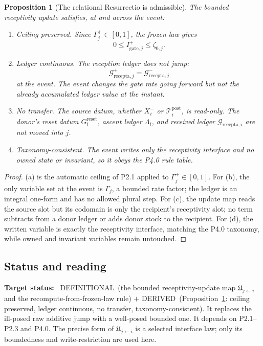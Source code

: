 \documentclass[11pt,a4paper]{article}
\newcommand{\stDerived}{\textcolor{cDer}{\textsf{\small DERIVED}}}
\newcommand{\stDef}{\textcolor{cDef}{\textsf{\small DEFINITIONAL}}}
\theoremstyle{definition}
\theoremstyle{plain}
\newtheorem{proposition}[definition]{Proposition}
\theoremstyle{remark}
\begin{document}
\begin{proposition}[The relational Resurrectio is admissible]\label{prop:relres}
The bounded receptivity update satisfies, at and across the event:
\begin{enumerate}[label=\textup{(\alph*)},leftmargin=1.2cm]
\item \emph{Ceiling preserved.} Since \(\Gamma_j^{+}\in[0,1]\), the frozen law gives
\[
0\le I_{\mathrm{gate},j}^{+}\le\zeta_{0,j}.
\]
\item \emph{Ledger continuous.} The reception ledger does not jump:
\[
\mathcal G_{\mathrm{recepta},j}^{+}
=
\mathcal G_{\mathrm{recepta},j}^{-}
\]
at the event. The event changes the gate rate going forward but not the already
accumulated ledger value at the instant.
\item \emph{No transfer.} The source datum, whether \(X_i^-\) or
\(\mathcal T_i^{\mathrm{post}}\), is read-only. The donor's reset datum
\(G_i^{\mathrm{reset}}\), ascent ledger \(\Lambda_i\), and received ledger
\(\mathcal G_{\mathrm{recepta},i}\) are not moved into \(j\).
\item \emph{Taxonomy-consistent.} The event writes only the receptivity interface
and no owned state or invariant, so it obeys the P4.0 rule table.
\end{enumerate}
\end{proposition}

\begin{proof}
(a) is the automatic ceiling of P2.1 applied to \(\Gamma_j^{+}\in[0,1]\). For
(b), the only variable set at the event is \(\Gamma_j\), a bounded rate factor; the
ledger is an integral one-form and has no allowed plural step. For (c), the update
map reads the source slot but its codomain is only the recipient's receptivity
slot; no term subtracts from a donor ledger or adds donor stock to the recipient.
For (d), the written variable is exactly the receptivity interface, matching the
P4.0 taxonomy, while owned and invariant variables remain untouched. \qedhere
\end{proof}

\subsection{Status and reading}

\textbf{Target status:}~
\stDef\ (the bounded receptivity-update map \(\mathfrak U_{j\leftarrow i}\) and the recompute-from-frozen-law
rule) \(+\) \stDerived\ (Proposition~\ref{prop:relres}: ceiling preserved, ledger continuous,
no transfer, taxonomy-consistent). It replaces the ill-posed raw additive jump with a
well-posed bounded one. It depends on P2.1--P2.3 and P4.0. The precise form of
\(\mathfrak U_{j\leftarrow i}\) is a selected interface law; only its boundedness and write-restriction
are used here.
\end{document}
